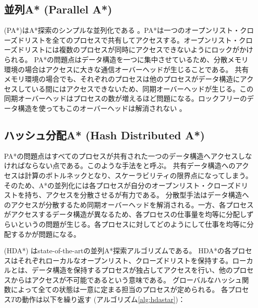 \subsection{並列A* (Parallel A*)}

 (PA*)はA*探索のシンプルな並列化である \cite{iranis86}。PA*は一つのオープンリスト・クローズドリストを全てのプロセスで共有してアクセスする。オープンリスト・クローズドリストには複数のプロセスが同時にアクセスできないようにロックがかけられる。
PA*の問題点はデータ構造を一つに集中させているため、分散メモリ環境の場合はアクセスに大きな通信オーバーヘッドが生じることである。
共有メモリ環境の場合でも、それぞれのプロセスは他のプロセスがデータ構造にアクセスしている間にはアクセスできないため、同期オーバーヘッドが生じる。この同期オーバーヘッドはプロセスの数が増えるほど問題になる。ロックフリーのデータ構造を使ってもこのオーバーヘッドは解消されない \cite{burnslrz10}。

\subsection{ハッシュ分配A* (Hash Distributed A*)}
\label{sec:hash-distributed-astar}

PA*の問題点はすべてのプロセスが共有された一つのデータ構造へアクセスしなければならない点である。このような手法をと呼ぶ。
共有データ構造へのアクセスは計算のボトルネックとなり、スケーラビリティの限界点になってしまう。
そのため、A*の並列化には各プロセスが自分のオープンリスト・クローズドリストを持ち、アクセスを分散させるが有力である。
分散型手法はデータ構造へのアクセスが分散するため同期オーバーヘッドを解消される。一方、各プロセスがアクセスするデータ構造が異なるため、各プロセスの仕事量を均等に分配しずらいというの問題が生じる。各プロセスに対してどのようにして仕事を均等に分配するかが問題になる。

 (HDA*) \cite{kishimotofb13}はstate-of-the-artの並列A*探索アルゴリズムである。
HDA*の各プロセスはそれぞれローカルなオープンリスト、クローズドリストを保持する。ローカルとは、データ構造を保持するプロセスが独占してアクセスを行い、他のプロセスからはアクセスが不可能であるという意味である。
グローバルなハッシュ関数によって全ての状態は一意に定まる担当のプロセスが定められる。
各プロセス$T$の動作は以下を繰り返す (アルゴリズム\ref{alg:hdastar})：

